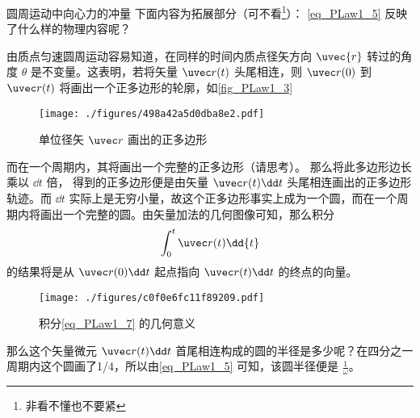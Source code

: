 \begin{example}{圆周运动中向心力的冲量}
下面内容为拓展部分（可不看\footnote{非看不懂也不要紧}）：
\autoref{eq_PLaw1_5} 反映了什么样的物理内容呢？

由质点匀速圆周运动容易知道，在同样的时间内质点径矢方向 $\uvec{r}$ 转过的角度 $\theta$ 是不变量。这表明，若将矢量 $\uvec r(t)$ 头尾相连，则 $\uvec r(0)$ 到 $\uvec r(t)$ 将画出一个正多边形的轮廓，如\autoref{fig_PLaw1_3} 
\begin{figure}[ht]
\centering
\texttt{[image: ./figures/498a42a5d0dba8e2.pdf]}
\caption{单位径矢 $\uvec r$ 画出的正多边形} \label{fig_PLaw1_3}
\end{figure}
而在一个周期内，其将画出一个完整的正多边形（请思考）。
那么将此多边形边长乘以 $\dd t$ 倍， 得到的正多边形便是由矢量 $\uvec r(t)\dd t$ 头尾相连画出的正多边形轨迹。而 $\dd t$ 实际上是无穷小量，故这个正多边形事实上成为一个圆，而在一个周期内将画出一个完整的圆。由矢量加法的几何图像可知，那么积分
\begin{equation}\label{eq_PLaw1_7}
\int_{0}^{t}\uvec r(t) \dd{t}
\end{equation}
的结果将是从 $\uvec r(0)\dd t$ 起点指向 $\uvec r(t)\dd t$ 的终点的向量。
\begin{figure}[ht]
\centering
\texttt{[image: ./figures/c0f0e6fc11f89209.pdf]}
\caption{积分\autoref{eq_PLaw1_7} 的几何意义} \label{fig_PLaw1_4}
\end{figure}
那么这个矢量微元 $\uvec r(t)\dd t$ 首尾相连构成的圆的半径是多少呢？在四分之一周期内这个圆画了1/4，所以由\autoref{eq_PLaw1_5} 可知，该圆半径便是 $\frac{1}{\omega}$。
\end{example}
